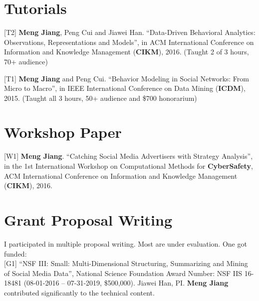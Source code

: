 \documentclass[margin, 10pt]{res}
\begin{document}
\begin{resume}

\section{Tutorials}

[T2] \textbf{Meng Jiang}, Peng Cui and Jiawei Han. ``Data-Driven Behavioral Analytics: Observations, Representations and Models'', in ACM International Conference on Information and Knowledge Management (\textbf{CIKM}), 2016. (Taught 2 of 3 hours, 70+ audience)

[T1] \textbf{Meng Jiang} and Peng Cui. ``Behavior Modeling in Social Networks: From Micro to Macro'', in IEEE International Conference on Data Mining (\textbf{ICDM}), 2015. (Taught all 3 hours, 50+ audience and \$700 honorarium)


\section{Workshop Paper}

[W1] \textbf{Meng Jiang}. ``Catching Social Media Advertisers with Strategy Analysis'', in the 1st International Workshop on Computational Methods for \textbf{CyberSafety}, ACM International Conference on Information and Knowledge Management (\textbf{CIKM}), 2016.


\section{Grant Proposal Writing}

{I participated in multiple proposal writing. Most are under evaluation. One got funded:} \\
{[G1]} ``NSF III: Small: Multi-Dimensional Structuring, Summarizing and Mining of Social Media Data'', National Science Foundation Award Number: NSF IIS 16-18481 (08-01-2016 -- 07-31-2019, \$500,000). Jiawei Han, PI. \textbf{Meng Jiang} contributed significantly to the technical content.


\end{resume}
\end{document}
